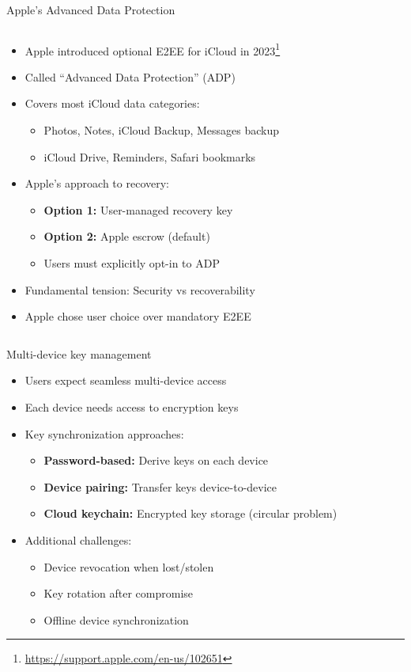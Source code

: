 \documentclass[aspectratio=169, lualatex, handout]{beamer}
\begin{document}
\begin{frame}{Apple's Advanced Data Protection}
	\begin{columns}[c]
		\begin{column}{1\textwidth}
			\begin{itemize}
				\item Apple introduced optional E2EE for iCloud in 2023\footnote{\url{https://support.apple.com/en-us/102651}}
				\item Called ``Advanced Data Protection'' (ADP)
				\item Covers most iCloud data categories:
				      \begin{itemize}
					      \item Photos, Notes, iCloud Backup, Messages backup
					      \item iCloud Drive, Reminders, Safari bookmarks
				      \end{itemize}
				\item Apple's approach to recovery:
				      \begin{itemize}
					      \item \textbf{Option 1:} User-managed recovery key
					      \item \textbf{Option 2:} Apple escrow (default)
					      \item Users must explicitly opt-in to ADP
				      \end{itemize}
				\item Fundamental tension: Security vs recoverability
				\item Apple chose user choice over mandatory E2EE
			\end{itemize}
		\end{column}
	\end{columns}
\end{frame}

\begin{frame}{Multi-device key management}
	\begin{itemize}
		\item Users expect seamless multi-device access
		\item Each device needs access to encryption keys
		\item Key synchronization approaches:
		      \begin{itemize}
			      \item \textbf{Password-based:} Derive keys on each device
			      \item \textbf{Device pairing:} Transfer keys device-to-device
			      \item \textbf{Cloud keychain:} Encrypted key storage (circular problem)
		      \end{itemize}
		\item Additional challenges:
		      \begin{itemize}
			      \item Device revocation when lost/stolen
			      \item Key rotation after compromise
			      \item Offline device synchronization
		      \end{itemize}
	\end{itemize}
\end{frame}
\end{document}
